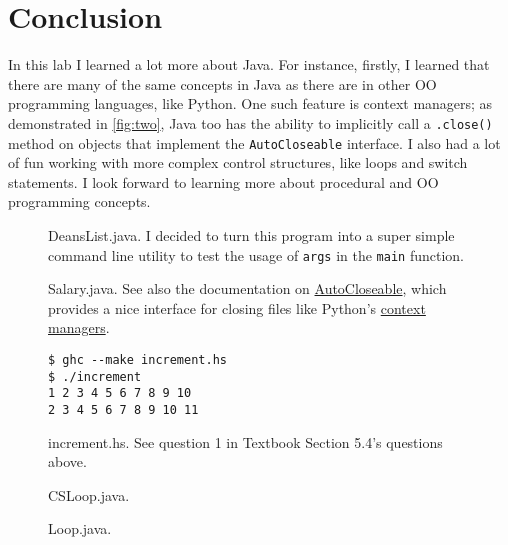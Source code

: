 \documentclass[leqno, 11pt]{article}
\begin{document}
\section*{Conclusion}
In this lab I learned a lot more about Java. For instance, firstly, I learned that there are many of the same concepts in Java as there are in other OO programming languages, like Python. One such feature is context managers; as demonstrated in \autoref{fig:two}, Java too has the ability to implicitly call a \texttt{.close()} method on objects that implement the \texttt{AutoCloseable} interface. I also had a lot of fun working with more complex control structures, like loops and switch statements. I look forward to learning more about procedural and OO programming concepts.
\newpage
\begin{figure}
  \centering
  
  \caption{DeansList.java. I decided to turn this program into a super simple command line utility to test the usage of \texttt{args} in the \texttt{main} function.}
  \label{fig:one}
\end{figure}
\begin{figure}
  \centering
  
  \caption{Salary.java. See also the documentation on \href{https://docs.oracle.com/javase/10/docs/api/java/lang/AutoCloseable.html}{AutoCloseable}, which provides a nice interface for closing files like Python's \href{https://docs.python.org/3/reference/compound_stmts.html\#with}{context managers}.}
  \label{fig:two}
\end{figure}
\begin{figure}
  \centering
  
  \begin{verbatim}
$ ghc --make increment.hs
$ ./increment
1 2 3 4 5 6 7 8 9 10
2 3 4 5 6 7 8 9 10 11
  \end{verbatim}
  \caption{increment.hs. See question 1 in Textbook Section 5.4's questions above.}
  \label{fig:four}
\end{figure}
\begin{figure}
  \centering
  
  \caption{CSLoop.java.}
  \label{fig:six}
\end{figure}
\begin{figure}
  \centering
  
  \caption{Loop.java.}
  \label{fig:seven}
\end{figure}
\end{document}
